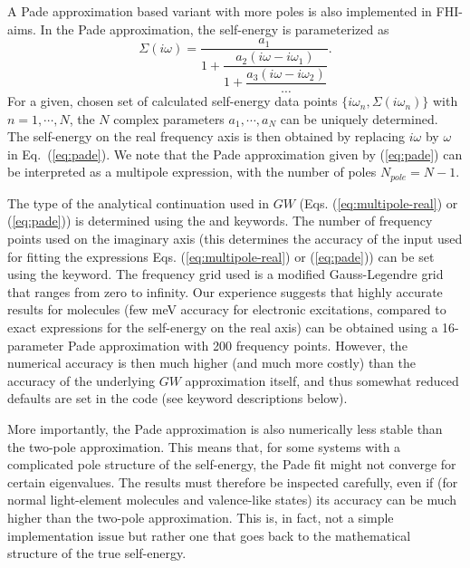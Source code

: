 A Pade approximation based variant with more poles is also implemented
in FHI-aims. In the Pade approximation, the self-energy is 
parameterized as
  \begin{equation}
       \displaystyle
       \Sigma(i\omega) =
       \dfrac{a_1}{1+\dfrac{a_2(i\omega-i\omega_1)}{1+\dfrac{a_3(i\omega-i\omega_2)}{\cdots}}} .
      \label{eq:pade}
  \end{equation}
For a given, chosen set of calculated self-energy data points
$\{i\omega_n, \Sigma(i\omega_n)\}$ with $n=1,\cdots, N$, the $N$
complex parameters  
$a_1, \cdots, a_N$ can be uniquely determined. The self-energy on the real
frequency axis is then obtained by replacing $i\omega$ by $\omega$ in   
Eq.~(\ref{eq:pade}). We note that the Pade approximation given by
(\ref{eq:pade}) can be interpreted as a multipole expression, with
the number of poles $N_{pole} = N-1$.

The type of the analytical continuation used in $GW$
(Eqs. (\ref{eq:multipole-real}) or (\ref{eq:pade})) is determined
using the  and 
keywords. The number of frequency points used on the imaginary axis
(this determines the accuracy of the input used for fitting the
expressions Eqs. (\ref{eq:multipole-real}) or (\ref{eq:pade})) can be
set using the  keyword. The frequency grid
used is a modified Gauss-Legendre grid that ranges from zero to
infinity. Our experience suggests that highly accurate results for molecules
(few meV accuracy for electronic excitations, compared to exact
expressions for the self-energy on the real axis) 
can be obtained using a 16-parameter Pade approximation with 200
frequency points.\cite{GW100} However, the numerical accuracy is then much higher
(and much more costly) than the accuracy of the underlying $GW$
approximation itself, and thus somewhat reduced defaults are set in
the code (see keyword descriptions below).

More importantly, the Pade approximation is also numerically less
stable than the two-pole approximation. This means that, for some
systems with a complicated pole structure of the self-energy, the Pade
fit might not converge for certain eigenvalues. The results must
therefore be inspected carefully, even if (for normal light-element
molecules and valence-like states) its accuracy can be much higher
than the two-pole approximation. This is, in fact, not a simple
implementation issue but rather one that goes back to the mathematical
structure of the true self-energy.


